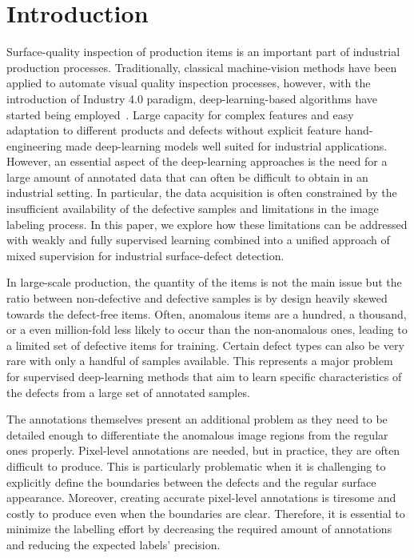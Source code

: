\section{Introduction}

Surface-quality inspection of production items is an important part of industrial production processes. Traditionally, classical machine-vision methods have been applied to automate visual quality inspection processes, however, with the introduction of Industry 4.0 paradigm, deep-learning-based algorithms have started being employed~\cite{Onchis2021,Yang2020,Tabernik2019JIM,Yu2019,Lin2018, Weimer2016}. Large capacity for complex features and easy adaptation to different products and defects without explicit feature hand-engineering made deep-learning models well suited for industrial applications. However, an essential aspect of the deep-learning approaches is the need for a large amount of annotated data that can often be difficult to obtain in an industrial setting. In particular, the data acquisition is often constrained by the insufficient availability of the defective samples and limitations in the image labeling process. In this paper, we explore how these limitations can be addressed with weakly and fully supervised learning combined into a unified approach of mixed supervision for industrial surface-defect detection.

In large-scale production, the quantity of the items is not the main issue but the ratio between non-defective and defective samples is by design heavily skewed towards the defect-free items. Often, anomalous items are a hundred, a thousand, or a even million-fold less likely to occur than the non-anomalous ones, leading to a limited set of defective items for training. Certain defect types can also be very rare with only a handful of samples available. This represents a major problem for supervised deep-learning methods that aim to learn specific characteristics of the defects from a large set of annotated samples.

The annotations themselves present an additional problem as they need to be detailed enough to differentiate the anomalous image regions from the regular ones properly. Pixel-level annotations are needed, but in practice, they are often difficult to produce. This is particularly problematic when it is challenging to explicitly define the boundaries between the defects and the regular surface appearance. Moreover, creating accurate pixel-level annotations is tiresome and costly to produce even when the boundaries are clear. Therefore, it is essential to minimize the labelling effort by decreasing the required amount of annotations and reducing the expected labels' precision.

